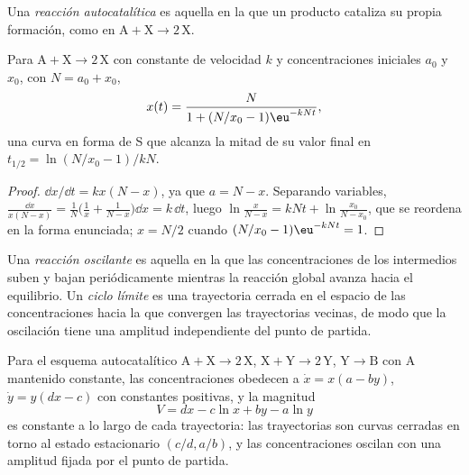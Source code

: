 \begin{definition}\label{def:b3:complex-kinetics:autocatalysis}
Una \emph{reacción autocatalítica} es aquella en la que un
producto cataliza su propia formación, como en $\mathrm{A + X \to 2\,X}$.
\end{definition}

\begin{proposition}\label{prop:b3:complex-kinetics:logistic}
Para $\mathrm{A + X \to 2\,X}$ con constante de velocidad $k$ y concentraciones iniciales $a_0$ y $x_0$,
con $N = a_0 + x_0$,
\[
  x(t) = \frac{N}{1 + (N/x_0 - 1)\eu^{-kNt}},
\]
una curva en forma de S que alcanza la mitad de su valor final en $t_{1/2} = \ln(N/x_0 - 1)/kN$.
\end{proposition}

\begin{proof}
$\dd x/\dd t = kx(N - x)$, ya que $a = N - x$. Separando variables, $\frac{\dd x}{x(N - x)} = \frac1N\bigl(\frac1x + \frac{1}{N - x}\bigr)\dd x
= k\,\dd t$, luego $\ln\frac{x}{N - x} = kNt + \ln\frac{x_0}{N - x_0}$, que se reordena en la forma enunciada;
$x = N/2$ cuando $(N/x_0 - 1)\eu^{-kNt} = 1$.
\end{proof}

\begin{definition}\label{def:b3:complex-kinetics:oscillating}
Una \emph{reacción oscilante} es aquella en la que las
concentraciones de los intermedios suben y bajan periódicamente mientras la reacción
global avanza hacia el equilibrio. Un \emph{ciclo límite} es
una trayectoria cerrada en el espacio de las concentraciones hacia la que convergen las trayectorias
vecinas, de modo que la oscilación tiene una amplitud independiente
del punto de partida.
\end{definition}

\begin{theorem}\label{thm:b3:complex-kinetics:lotka-volterra}
Para el esquema autocatalítico $\mathrm{A + X \to 2\,X}$, $\mathrm{X + Y \to 2\,Y}$, $\mathrm{Y \to B}$ con A mantenido
constante, las concentraciones obedecen a $\dot x = x(a - by)$, $\dot y = y(dx - c)$ con constantes
positivas, y la magnitud
\[
  V = dx - c\ln x + by - a\ln y
\]
es constante a lo largo de cada trayectoria: las trayectorias son curvas cerradas en torno
al estado estacionario $(c/d, a/b)$, y las concentraciones oscilan con una
amplitud fijada por el punto de partida.
\end{theorem}

